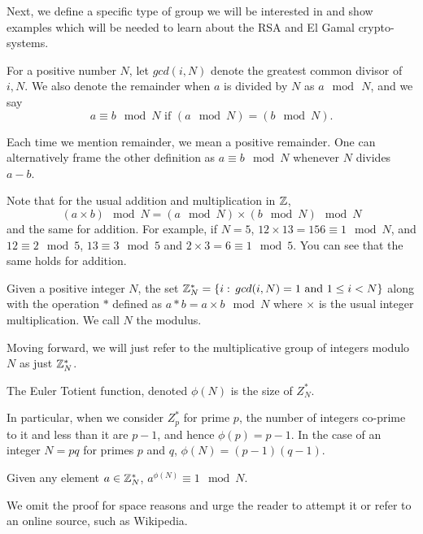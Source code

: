 Next, we define a specific type of group we will be interested in and show examples which will be needed to learn about the RSA and El Gamal crypto-systems. 

For a positive number $N$, let $gcd(i, N)$ denote the greatest common divisor of $i, N$. We also denote the remainder when $a$ is divided by $N$ as $a\mod \, N$, and we say 
\[
a\equiv  b \mod N \text{ if } (a \mod N) = (b\mod N).
\]
\begin{remark}
Each time we mention remainder, we mean a positive remainder. One can alternatively frame the other definition as $a \equiv b \mod N$ whenever $N$ divides $a - b$.
\end{remark}
Note that for the usual addition and multiplication in ${{\mathbb Z}}$, 
\[
(a\times b)\mod N = (a\mod N)\times (b \mod N)\mod N
\]
and the same for addition. For example, if $N = 5$, $12\times 13 = 156 \equiv 1 \mod N$, and $12 \equiv 2 \mod 5$, $13\equiv 3 \mod 5$ and $2\times 3 = 6 \equiv 1 \mod 5$. You can see that the same holds for addition.

\begin{defn}
Given a positive integer $N$, the set ${{\mathbb Z}}^*_{N} = \{i : \, gcd(i, N) = 1 \text{ and } 1\leq i < N\}$ along with the operation $*$ defined as $a*b = a\times b\mod N$ where $\times$ is the usual integer multiplication. We call $N$ the modulus.
\end{defn}

Moving forward, we will just refer to the multiplicative group of integers modulo $N$ as just ${{\mathbb Z}}^*_N$. 
\begin{defn}
The Euler Totient function, denoted $\phi(N)$ is the size of $Z^*_N$.
\end{defn}

In particular, when we consider $Z^*_p$ for prime $p$, the number of integers co-prime to it and less than it are $p - 1$, and hence $\phi (p) = p-1$. In the case of an integer $N=pq$ for primes $p$ and $q$, $\phi(N) = (p-1)(q-1)$.

\begin{thm}\label{euler}
Given any element $a\in {{\mathbb Z}}_N^*$, $a^{\phi(N)} \equiv 1\mod N$.
\end{thm}
We omit the proof for space reasons and urge the reader to attempt it or refer to an online source, such as Wikipedia.

